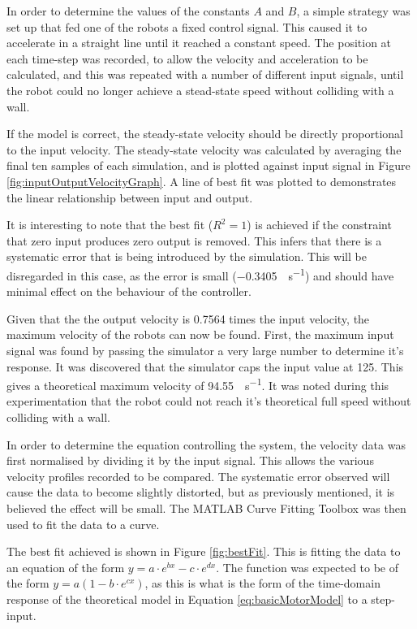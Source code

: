 \documentclass[10pt]{article}
\begin{document}
In order to determine the values of the constants $A$ and $B$, a simple strategy
was set up that fed one of the robots a fixed control signal.  This caused it to
accelerate in a straight line until it reached a constant speed.  The position
at each time-step was recorded, to allow the velocity and acceleration to be
calculated, and this was repeated with a number of different input signals,
until the robot could no longer achieve a stead-state speed without colliding
with a wall.

If the model is correct, the steady-state velocity should be directly
proportional to the input velocity.  The steady-state velocity was calculated by
averaging the final ten samples of each simulation, and is plotted against input
signal in Figure \ref{fig:inputOutputVelocityGraph}.  A line of best fit was
plotted to demonstrates the linear relationship between input and output.

It is interesting to note that the best fit ($R^2 = 1$) is achieved if the
constraint that zero input produces zero output is removed.  This infers that
there is a systematic error that is being introduced by the simulation.  This
will be disregarded in this case, as the error is small
(\SI{-0.3405}{\inch\per\second}) and should have minimal effect on the behaviour
of the controller.

Given that the the output velocity is 0.7564 times the input velocity, the
maximum velocity of the robots can now be found. First, the maximum input signal
was found by passing the simulator a very large number to determine it's
response. It was discovered that the simulator caps the input value at 125.
This gives a theoretical maximum velocity of \SI{94.55}{\inch\per\second}.   It
was noted during this experimentation that the robot could not reach it's
theoretical full speed without colliding with a wall.

In order to determine the equation controlling the system, the velocity data was
first normalised by dividing it by the input signal.  This allows the various
velocity profiles recorded to be compared.  The systematic error observed will
cause the data to become slightly distorted, but as previously mentioned, it is
believed the effect will be small.  The MATLAB Curve Fitting Toolbox was then
used to fit the data to a curve.

The best fit achieved is shown in Figure \ref{fig:bestFit}.  This is fitting the
data to an equation of the form $y = a \cdot e^{bx} - c \cdot e^{dx} $.  The
function was expected to be of the form $y = a(1-b \cdot e^{cx})$, as this is
what is the form of the time-domain response of the theoretical model in
Equation \ref{eq:basicMotorModel} to a step-input.
\end{document}
